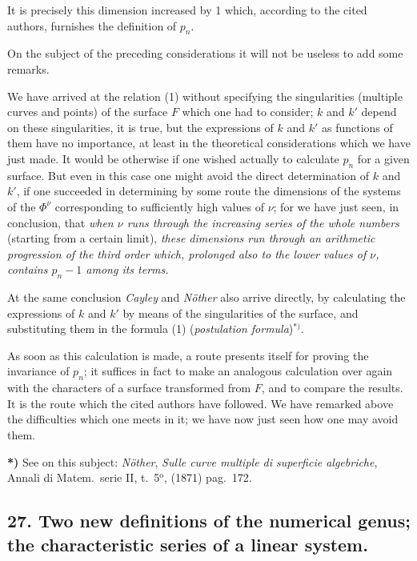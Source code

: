 \documentclass{article}
\begin{document}
It is precisely this dimension increased by 1 which, according to the cited authors, furnishes the definition of $p_{n}$.

On the subject of the preceding considerations it will not be useless to add some remarks.

We have arrived at the relation (1) without specifying the singularities (multiple curves and points) of the surface $F$ which one had to consider; $k$ and $k'$ depend on these singularities, it is true, but the expressions of $k$ and $k'$ as functions of them have no importance, at least in the theoretical considerations which we have just made. It would be otherwise if one wished actually to calculate $p_{n}$ for a given surface. But even in this case one might avoid the direct determination of $k$ and $k'$, if one succeeded in determining by some route the dimensions of the systems of the $\Phi^{\nu}$ corresponding to sufficiently high values of $\nu$; for we have just seen, in conclusion, that \emph{when $\nu$ runs through the increasing series of the whole numbers} (starting from a certain limit), \emph{these dimensions run through an arithmetic progression of the third order which, prolonged also to the lower values of $\nu$, contains $p_{n} - 1$ among its terms.}

At the same conclusion \emph{Cayley} and \emph{Nöther} also arrive directly, by calculating the expressions of $k$ and $k'$ by means of the singularities of the surface, and substituting them in the formula (1) (\emph{postulation formula})${}^{*)}$.

As soon as this calculation is made, a route presents itself for proving the invariance of $p_{n}$; it suffices in fact to make an analogous calculation over again with the characters of a surface transformed from $F$, and to compare the results. It is the route which the cited authors have followed. We have remarked above the difficulties which one meets in it; we have now just seen how one may avoid them.

\textbf{*)} See on this subject: \emph{Nöther}, \emph{Sulle curve multiple di superficie algebriche}, Annali di Matem.\ serie II, t.\ 5${}^{\text{o}}$, (1871) pag.\ 172.


\subsection*{27. Two new definitions of the numerical genus; the characteristic series of a linear system.}
\end{document}

